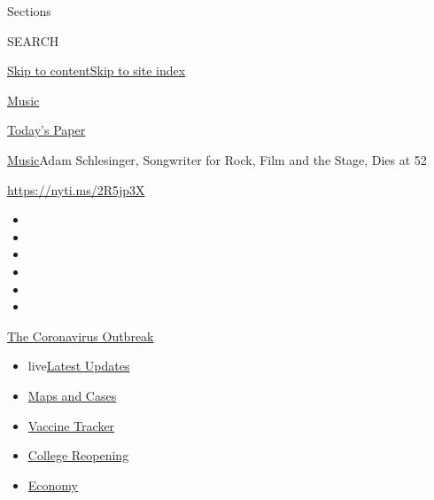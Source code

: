 Sections

SEARCH

\protect\hyperlink{site-content}{Skip to
content}\protect\hyperlink{site-index}{Skip to site index}

\href{https://www.nytimes3xbfgragh.onion/section/arts/music}{Music}

\href{https://myaccount.nytimes3xbfgragh.onion/auth/login?response_type=cookie\&client_id=vi}{}

\href{https://www.nytimes3xbfgragh.onion/section/todayspaper}{Today's
Paper}

\href{/section/arts/music}{Music}\textbar{}Adam Schlesinger, Songwriter
for Rock, Film and the Stage, Dies at 52

\url{https://nyti.ms/2R5jp3X}

\begin{itemize}
\item
\item
\item
\item
\item
\item
\end{itemize}

\href{https://www.nytimes3xbfgragh.onion/news-event/coronavirus?action=click\&pgtype=Article\&state=default\&region=TOP_BANNER\&context=storylines_menu}{The
Coronavirus Outbreak}

\begin{itemize}
\tightlist
\item
  live\href{https://www.nytimes3xbfgragh.onion/2020/08/04/world/coronavirus-covid-19.html?action=click\&pgtype=Article\&state=default\&region=TOP_BANNER\&context=storylines_menu}{Latest
  Updates}
\item
  \href{https://www.nytimes3xbfgragh.onion/interactive/2020/us/coronavirus-us-cases.html?action=click\&pgtype=Article\&state=default\&region=TOP_BANNER\&context=storylines_menu}{Maps
  and Cases}
\item
  \href{https://www.nytimes3xbfgragh.onion/interactive/2020/science/coronavirus-vaccine-tracker.html?action=click\&pgtype=Article\&state=default\&region=TOP_BANNER\&context=storylines_menu}{Vaccine
  Tracker}
\item
  \href{https://www.nytimes3xbfgragh.onion/2020/08/02/us/covid-college-reopening.html?action=click\&pgtype=Article\&state=default\&region=TOP_BANNER\&context=storylines_menu}{College
  Reopening}
\item
  \href{https://www.nytimes3xbfgragh.onion/live/2020/08/03/business/stock-market-today-coronavirus?action=click\&pgtype=Article\&state=default\&region=TOP_BANNER\&context=storylines_menu}{Economy}
\end{itemize}

